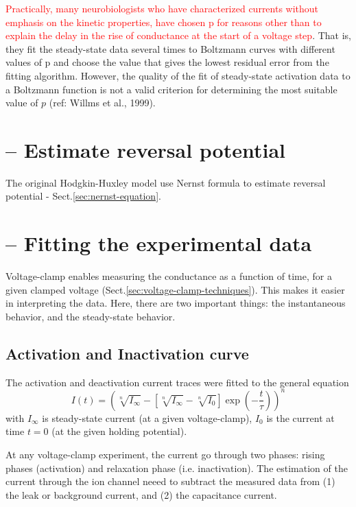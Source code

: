 \textcolor{red}{Practically, many neurobiologists who have characterized
currents without emphasis on the kinetic properties, have chosen p for reasons
other than to explain the delay in the rise of conductance at the start of a
voltage step}. That is, they fit the steady-state data several times to
Boltzmann curves with different values of p and choose the value that gives the
lowest residual error from the fitting algorithm. However, the quality of the
fit of steady-state activation data to a Boltzmann function is not a valid
criterion for determining the most suitable value of $p$ (ref: Willms et al.,
1999).

\section{-- Estimate reversal potential}

The original Hodgkin-Huxley model use Nernst formula to estimate reversal
potential - Sect.\ref{sec:nernst-equation}.

\section{-- Fitting the experimental data}


Voltage-clamp enables measuring the conductance as a function of time, for a
given clamped voltage (Sect.\ref{sec:voltage-clamp-techniques}). This makes it easier in
interpreting the data. Here, there are two important things: the instantaneous
behavior, and the steady-state behavior.



\subsection{Activation and Inactivation curve}
\label{sec:activation-curve}
\label{sec:inactivation-curve}

The activation
and deactivation current traces were fitted to the general equation
\begin{equation}
I(t) = \left( \sqrt[n]{I_\infty} - \left[ \sqrt[n]{I_\infty} -
\sqrt[n]{I_0}\right] \exp(-\frac{t}{\tau}) \right)^n
\end{equation}
with $I_\infty$	 is steady-state current (at a given voltage-clamp), $I_0$
is the current at time $t=0$ (at the given holding potential).

At any voltage-clamp experiment, the current go through two phases: rising
phases (activation) and relaxation phase (i.e. inactivation). The estimation of
the current through the ion channel neeed to subtract the measured data from (1) the leak or
background current, and (2) the capacitance current.

